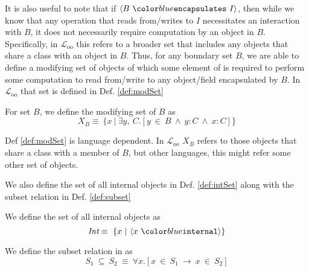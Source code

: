 \documentclass[acmsmall,review,anonymous]{acmart}\settopmatter{printfolios=true,printccs=false,printacmref=false}
\begin{document}
It is also useful to note that if $\encapsulates{B}{I}$, then while we know that 
any operation that reads from/writes to $I$ necessitates an interaction with $B$,
it does not necessarily require computation by an object in $B$. Specifically, 
in $\mathcal{L}_\text{oo}$ this refers to a broader set that includes any objects
that share a class with an object in $B$. Thus, for any boundary set $B$, we are 
able to define a modifying set of objects of which some element of is required to 
perform some computation to read from/write to any object/field encapsulated by 
$B$. In $\mathcal{L}_\text{oo}$ that set is defined in Def. \ref{def:modSet}
\begin{definition}
\label{def:modSet}
For set $B$, we define the modifying set of $B$ as
$$X_B \equiv\ \{x\ |\ \exists y,\ C.[y\ \in\ B\ \wedge\ y : C\ \wedge\ x : C]\}$$
\end{definition}
Def \ref{def:modSet} is language dependent. In $\mathcal{L}_\text{oo}$ $X_B$ refers to
those objects that share a class with a member of $B$, 
but other languages, this might refer some other set of objects.

We also define the set of all internal objects in Def. \ref{def:intSet} along with 
the subset relation in Def. \ref{def:subset}
\begin{definition}
\label{def:intSet}
We define the set of all internal objects as
$$\I \equiv\ \{x\ |\ \internal{x} \}$$
\end{definition}
\begin{definition}[Subset]
\label{def:subset}
We define the subset relation in \Chainmail as
$$S_1\ \subseteq\ S_2\ \equiv\ \forall x.[x\ \in\ S_1\ \longrightarrow\ x\ \in\ S_2]$$
\end{definition}
\end{document}

